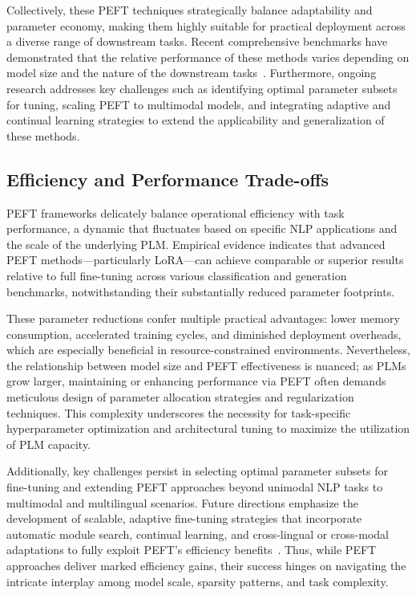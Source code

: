 \documentclass[sigconf]{acmart}
\begin{document}
Collectively, these PEFT techniques strategically balance adaptability and parameter economy, making them highly suitable for practical deployment across a diverse range of downstream tasks. Recent comprehensive benchmarks have demonstrated that the relative performance of these methods varies depending on model size and the nature of the downstream tasks~\cite{ref48}. Furthermore, ongoing research addresses key challenges such as identifying optimal parameter subsets for tuning, scaling PEFT to multimodal models, and integrating adaptive and continual learning strategies to extend the applicability and generalization of these methods.

\subsection{Efficiency and Performance Trade-offs}

PEFT frameworks delicately balance operational efficiency with task performance, a dynamic that fluctuates based on specific NLP applications and the scale of the underlying PLM. Empirical evidence indicates that advanced PEFT methods—particularly LoRA—can achieve comparable or superior results relative to full fine-tuning across various classification and generation benchmarks, notwithstanding their substantially reduced parameter footprints.

These parameter reductions confer multiple practical advantages: lower memory consumption, accelerated training cycles, and diminished deployment overheads, which are especially beneficial in resource-constrained environments. Nevertheless, the relationship between model size and PEFT effectiveness is nuanced; as PLMs grow larger, maintaining or enhancing performance via PEFT often demands meticulous design of parameter allocation strategies and regularization techniques. This complexity underscores the necessity for task-specific hyperparameter optimization and architectural tuning to maximize the utilization of PLM capacity. 

Additionally, key challenges persist in selecting optimal parameter subsets for fine-tuning and extending PEFT approaches beyond unimodal NLP tasks to multimodal and multilingual scenarios. Future directions emphasize the development of scalable, adaptive fine-tuning strategies that incorporate automatic module search, continual learning, and cross-lingual or cross-modal adaptations to fully exploit PEFT’s efficiency benefits~\cite{ref48}. Thus, while PEFT approaches deliver marked efficiency gains, their success hinges on navigating the intricate interplay among model scale, sparsity patterns, and task complexity.
\end{document}
